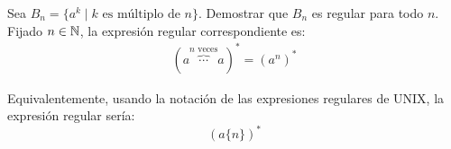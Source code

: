\begin{ejercicio}
    Sea $B_n = \{a^k \mid k \text{ es múltiplo de } n\}$. Demostrar que $B_n$ es regular para todo $n$.\\

    Fijado $n\in \mathbb{N}$, la expresión regular correspondiente es:
    \begin{align*}
        (a\overbrace{\cdots }^{n \text{ veces}}a)^* = (a^n)^*
    \end{align*}

    Equivalentemente, usando la notación de las expresiones regulares de UNIX, la expresión regular sería:
    \begin{equation*}
        (a\{n\})^*
    \end{equation*}
\end{ejercicio}

